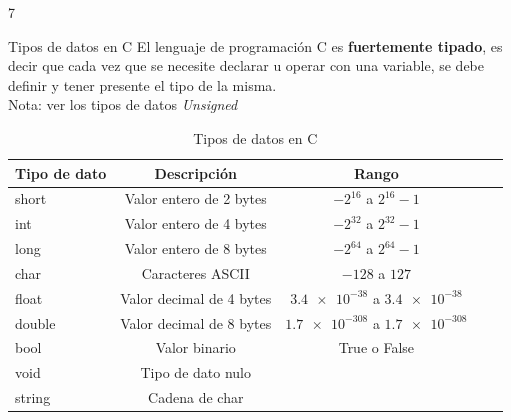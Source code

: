 7\documentclass[xcolor=pdftex,table,11pt]{beamer}
\begin{document}
\begin{frame} {Tipos de datos en C}
El lenguaje de programación C es \textbf{fuertemente tipado}, es decir que cada vez que se necesite declarar u operar con una variable, se debe definir y tener presente el tipo de la misma. \\
Nota: ver los tipos de datos \textit{Unsigned}
\begin{table}
\begin{tabular}{l | c | c | c | l }
Tipo de dato & Descripción & Rango  \\
\hline \hline
short & Valor entero de 2 bytes & $-2^{16}$ a $2^{16} -1 $\\ 
int & 	Valor entero de 4 bytes & $-2^{32}$ a $2^{32} -1 $\\ 
long & 	Valor entero de 8 bytes & $-2^{64}$ a $2^{64} -1 $\\ 
char & Caracteres ASCII & $-128 $ a $127$\\ 
float & Valor decimal de 4 bytes & $\num{3.4e-38} $ a $\num{3.4e-38}$\\ 
double & Valor decimal de 8 bytes & $\num{1.7e-308} $ a $\num{1.7e-308}$\\ 
bool & Valor binario &True o False\\ 
void & Tipo de dato nulo &\\ 
 string & Cadena de char  &\\ 
\end{tabular}
\caption{Tipos de datos en C}

\end{table}

\end{frame}
\end{document}
